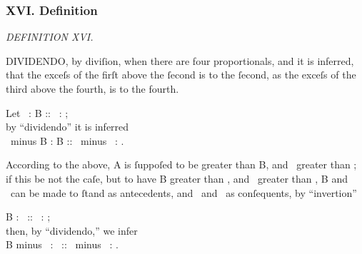\documentclass[11pt,preview]{standalone}
\begin{document}
\newcommand{\redA}{{\color{cred}{A}}}
\newcommand{\blueC}{{\color{cblue}{C}}}
\newcommand{\yellowD}{{\color{cyellow}{D}}}

\subsubsection{XVI. Definition}

\begin{minipage}{\textwidth}
    \begin{center}
        \textit{DEFINITION XVI.}\label{book5def16} \\
    \end{center}

    \hfill
\end{minipage}

\raggedright D\textsc{IVIDENDO}, by diviſion, when there are four proportionals, and it is inferred, that the exceſs of the firſt above the ſecond is to the ſecond, as the exceſs of the third above the fourth, is to the fourth.\\

\hfill

\begin{center}
    Let \redA\ : B :: \blueC\ : \yellowD;\\
    by “dividendo” it is inferred\\
    \redA\ minus B : B :: \blueC\ minus \yellowD\ : \yellowD.
\end{center}

\hfill

According to the above, A is ſuppoſed to be greater than B, and \blueC\ greater than \yellowD; if this be not the caſe, but to have B greater than \redA, and \yellowD\ greater than \blueC, B and \yellowD\ can be made to ſtand as antecedents, and \redA\ and \blueC\ as conſequents, by “invertion”\\

\begin{center}
    B : \redA\ :: \yellowD\ : \blueC;\\
    then, by “dividendo,” we infer\\
    B minus \redA\ : \redA\ :: \yellowD\ minus \blueC\ : \blueC.
\end{center}
\end{document}
